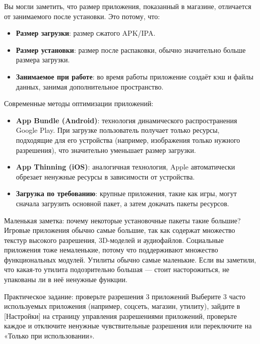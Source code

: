 
Вы могли заметить, что размер приложения, показанный в магазине, отличается от занимаемого после установки. Это потому, что:

\begin{itemize}
  \item \textbf{Размер загрузки}: размер сжатого APK/IPA.
  \item \textbf{Размер установки}: размер после распаковки, обычно значительно больше размера загрузки.
  \item \textbf{Занимаемое при работе}: во время работы приложение создаёт кэш и файлы данных, занимая дополнительное пространство.
\end{itemize}

Современные методы оптимизации приложений:

\begin{itemize}
  \item \textbf{App Bundle (Android)}: технология динамического распространения Google Play. При загрузке пользователь получает только ресурсы, подходящие для его устройства (например, изображения только нужного разрешения), что значительно уменьшает размер загрузки.
  \item \textbf{App Thinning (iOS)}: аналогичная технология, Apple автоматически обрезает ненужные ресурсы в зависимости от устройства.
  \item \textbf{Загрузка по требованию}: крупные приложения, такие как игры, могут сначала загрузить основной пакет, а затем докачать пакеты ресурсов.
\end{itemize}

\begin{tcbinfo}{Маленькая заметка: почему некоторые установочные пакеты такие большие?}
Игровые приложения обычно самые большие, так как содержат множество текстур высокого разрешения, 3D-моделей и аудиофайлов. Социальные приложения тоже немаленькие, потому что поддерживают множество функциональных модулей. Утилиты обычно самые маленькие. Если вы заметили, что какая-то утилита подозрительно большая — стоит насторожиться, не упакованы ли в неё ненужные функции.

\end{tcbinfo}

\begin{tcbpractice}{Практическое задание: проверьте разрешения 3 приложений}
Выберите 3 часто используемых приложения (например, соцсеть, магазин, утилиту), зайдите в [Настройки] на страницу управления разрешениями приложений, проверьте каждое и отключите ненужные чувствительные разрешения или переключите на «Только при использовании».

\end{tcbpractice}
